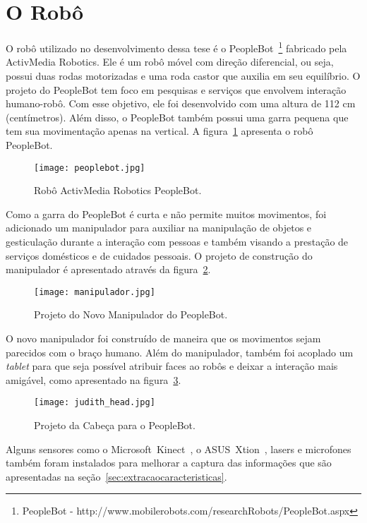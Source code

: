 \section{O Robô}
\label{sec:robo}
O robô utilizado no desenvolvimento dessa tese é o PeopleBot~\footnote{PeopleBot - http://www.mobilerobots.com/researchRobots/PeopleBot.aspx} fabricado pela ActivMedia Robotics. Ele é um robô móvel com direção diferencial, ou seja, possui duas rodas motorizadas e uma roda castor que auxilia em seu equilíbrio. O projeto do PeopleBot tem foco em pesquisas e serviços que envolvem interação humano-robô. Com esse objetivo, ele foi desenvolvido com uma altura de 112 cm (centímetros). Além disso, o PeopleBot também possui uma garra pequena que tem sua movimentação apenas na vertical. A figura~\ref{fig:peoplebot} apresenta o robô PeopleBot.

\begin{figure}[ht!]
	\centering
	\texttt{[image: peoplebot.jpg]}
	\caption{Robô ActivMedia Robotics PeopleBot.}
	\label{fig:peoplebot}
\end{figure}

Como a garra do PeopleBot é curta e não permite muitos movimentos, foi adicionado um manipulador para auxiliar na manipulação de objetos e gesticulação durante a interação com pessoas e também visando a prestação de serviços domésticos e de cuidados pessoais. O projeto de construção do manipulador é apresentado através da figura~\ref{fig:manipulador}.

\begin{figure}[ht!]
	\centering
	\texttt{[image: manipulador.jpg]}
	\caption{Projeto do Novo Manipulador do PeopleBot.}
	\label{fig:manipulador}
\end{figure}

O novo manipulador foi construído de maneira que os movimentos sejam parecidos com o braço humano. Além do manipulador, também foi acoplado um \emph{tablet} para que seja possível atribuir faces ao robôs e deixar a interação mais amigável, como apresentado na figura~\ref{fig:judithhead}.

\begin{figure}[ht!]
	\centering
	\texttt{[image: judith\_head.jpg]}
	\caption{Projeto da Cabeça para o PeopleBot.}
	\label{fig:judithhead}
\end{figure}

Alguns sensores como o Microsoft\textregistered\ Kinect\textregistered\ , o ASUS\textregistered\ Xtion\textregistered\ , lasers e microfones também foram instalados para melhorar a captura das informações que são apresentadas na seção~\ref{sec:extracaocaracteristicas}.

